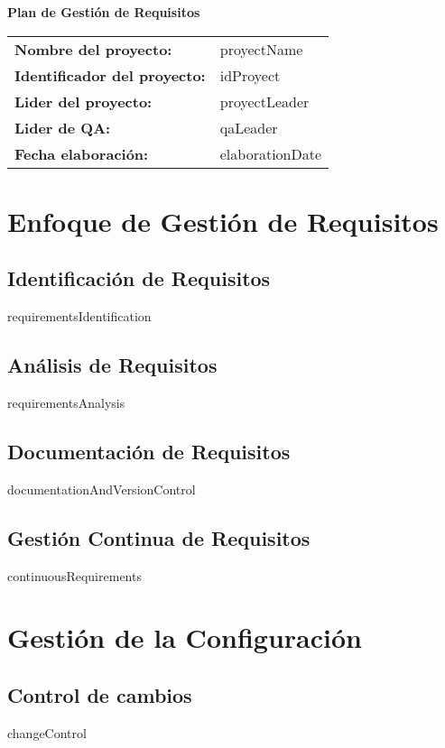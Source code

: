 \documentclass{article}
\begin{document}
    \begin{center}
    {\huge\textbf{Plan de Gestión de Requisitos}}\\[1cm]
    \end{center}

    \renewcommand{\arraystretch}{1.5}

    \begin{tabular}{|ll|} \hline
    \rowcolor{gray!10}\textbf{Nombre del proyecto:} & {{proyectName}} \\[0.3cm]
    \textbf{Identificador del proyecto:} & {{idProyect}} \\[0.3cm]
    \textbf{Lider del proyecto:} & {{proyectLeader}} \\[0.3cm]
    \textbf{Lider de QA:} & {{qaLeader}} \\[0.3cm]
    \textbf{Fecha elaboración:} & {{elaborationDate}} \\ \hline
    \end{tabular}

    \newpage
    
    \tableofcontents
    \newpage
    
    \section{Enfoque de Gestión de Requisitos}
    \subsection{Identificación de Requisitos}
    {{requirementsIdentification}}
    \subsection{Análisis de Requisitos}
    {{requirementsAnalysis}}
    \subsection{Documentación de Requisitos}
    {{documentationAndVersionControl}}
    \subsection{Gestión Continua de Requisitos}
    {{continuousRequirements}}
    
    \section{Gestión de la Configuración}
    \subsection{Control de cambios}
    {{changeControl}}
    
\end{document}
